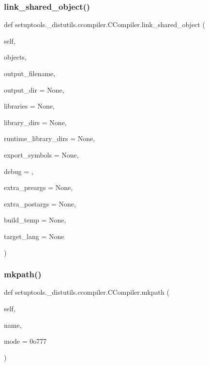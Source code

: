 \subsubsection{\texorpdfstring{link\+\_\+shared\+\_\+object()}{link\_shared\_object()}}
{\footnotesize\ttfamily def setuptools.\+\_\+distutils.\+ccompiler.\+C\+Compiler.\+link\+\_\+shared\+\_\+object (\begin{DoxyParamCaption}\item[{}]{self,  }\item[{}]{objects,  }\item[{}]{output\+\_\+filename,  }\item[{}]{output\+\_\+dir = {\ttfamily None},  }\item[{}]{libraries = {\ttfamily None},  }\item[{}]{library\+\_\+dirs = {\ttfamily None},  }\item[{}]{runtime\+\_\+library\+\_\+dirs = {\ttfamily None},  }\item[{}]{export\+\_\+symbols = {\ttfamily None},  }\item[{}]{debug = {},  }\item[{}]{extra\+\_\+preargs = {\ttfamily None},  }\item[{}]{extra\+\_\+postargs = {\ttfamily None},  }\item[{}]{build\+\_\+temp = {\ttfamily None},  }\item[{}]{target\+\_\+lang = {\ttfamily None} }\end{DoxyParamCaption})}

\mbox{\label{classsetuptools_1_1__distutils_1_1ccompiler_1_1CCompiler_ab410541aef9ab8805ec1ac1632d55186}} 
\subsubsection{\texorpdfstring{mkpath()}{mkpath()}}
{\footnotesize\ttfamily def setuptools.\+\_\+distutils.\+ccompiler.\+C\+Compiler.\+mkpath (\begin{DoxyParamCaption}\item[{}]{self,  }\item[{}]{name,  }\item[{}]{mode = {\ttfamily 0o777} }\end{DoxyParamCaption})}

